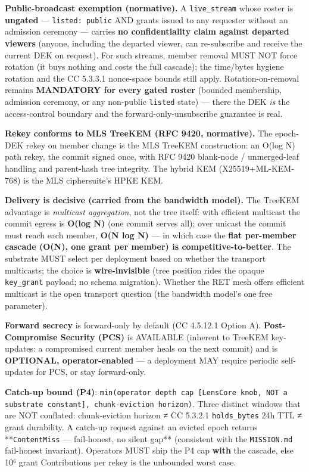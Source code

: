 \documentclass[11pt]{article}
\begin{document}
\textbf{Public-broadcast exemption (normative).} A \texttt{live\_stream} whose roster is \textbf{ungated} — \texttt{listed: public} AND grants issued to any requester without an admission ceremony — carries \textbf{no confidentiality claim against departed viewers} (anyone, including the departed viewer, can re-subscribe and receive the current DEK on request). For such streams, member removal MUST NOT force rotation (it buys nothing and costs the full cascade); the time/bytes hygiene rotation and the CC 5.3.3.1 nonce-space bounds still apply. Rotation-on-removal remains \textbf{MANDATORY for every gated roster} (bounded membership, admission ceremony, or any non-public \texttt{listed} state) — there the DEK \textit{is} the access-control boundary and the forward-only-unsubscribe guarantee is real.


\textbf{Rekey conforms to MLS TreeKEM (RFC 9420, normative).} The epoch-DEK rekey on member change is the MLS TreeKEM construction: an O(log N) path rekey, the commit signed once, with RFC 9420 blank-node / unmerged-leaf handling and parent-hash tree integrity. The hybrid KEM (X25519+ML-KEM-768) is the MLS ciphersuite's HPKE KEM.


\textbf{Delivery is decisive (carried from the bandwidth model).} The TreeKEM advantage is \textit{multicast aggregation}, not the tree itself: with efficient multicast the commit egress is \textbf{O(log N)} (one commit serves all); over unicast the commit must reach each member, \textbf{O(N log N)} — in which case the \textbf{flat per-member cascade (O(N), one grant per member) is competitive-to-better}. The substrate MUST select per deployment based on whether the transport multicasts; the choice is \textbf{wire-invisible} (tree position rides the opaque \texttt{key\_grant} payload; no schema migration). Whether the RET mesh offers efficient multicast is the open transport question (the bandwidth model's one free parameter).


\textbf{Forward secrecy} is forward-only by default (CC 4.5.12.1 Option A). \textbf{Post-Compromise Security (PCS)} is AVAILABLE (inherent to TreeKEM key-updates: a compromised current member heals on the next commit) and is \textbf{OPTIONAL, operator-enabled} — a deployment MAY require periodic self-updates for PCS, or stay forward-only.


\textbf{Catch-up bound (P4)}: \texttt{min(operator depth cap [LensCore knob, NOT a substrate constant], chunk-eviction horizon)}. Three distinct windows that are NOT conflated: chunk-eviction horizon ≠ CC 5.3.2.1 \texttt{holds\_bytes} 24h TTL ≠ grant durability. A catch-up request against an evicted epoch returns **\texttt{ContentMiss} — fail-honest, no silent gap** (consistent with the \texttt{MISSION.md} fail-honest invariant). Operators MUST ship the P4 cap \textbf{with} the cascade, else 10⁶ grant Contributions per rekey is the unbounded worst case.
\end{document}
